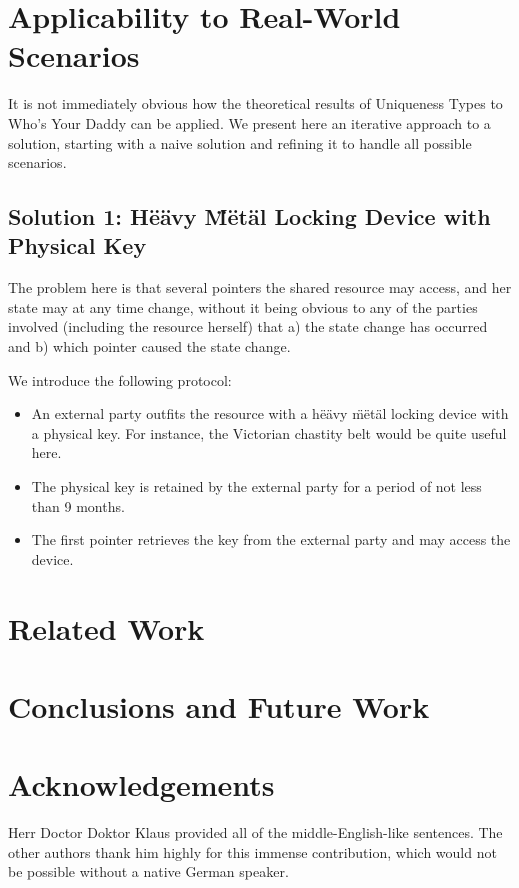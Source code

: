 \documentclass[10pt,twocolumn,letterpaper]{article}
\begin{document}
\section{Applicability to Real-World Scenarios}
It is not immediately obvious how the theoretical results of Uniqueness Types to Who's Your Daddy can be applied. We present here an iterative approach to a solution, starting with a naive solution and refining it to handle all possible scenarios.

\subsection{Solution 1: H\"{e}\"{a}vy \"{M}\"{e}t\"{a}l Locking Device with Physical Key}
The problem here is that several pointers the shared resource may access, and her state may at any time change, without it being obvious to any of the parties involved (including the resource herself) that a) the state change has occurred and b) which pointer caused the state change.

We introduce the following protocol:
\begin{itemize}
\item An external party outfits the resource with a h\"{e}\"{a}vy \"{m}\"{e}t\"{a}l locking device with a physical key. For instance, the Victorian chastity belt would be quite useful here.
\item The physical key is retained by the external party for a period of not less than 9 months.
\item The first pointer retrieves the key from the external party and may access the device.
\end{itemize}


\section{Related Work}

\section{Conclusions and Future Work}
\section{Acknowledgements}
Herr Doctor Doktor Klaus provided all of the middle-English-like sentences. The other authors thank him highly for this immense contribution, which would not be possible without a native German speaker.
\end{document}
